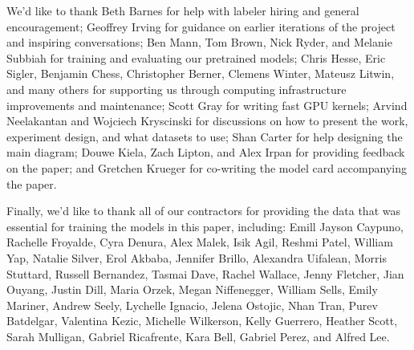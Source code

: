We'd like to thank Beth Barnes for help with labeler hiring and general encouragement; Geoffrey Irving for guidance on earlier iterations of the project and inspiring conversations; Ben Mann, Tom Brown, Nick Ryder, and Melanie Subbiah for training and evaluating our pretrained models; Chris Hesse, Eric Sigler, Benjamin Chess, Christopher Berner, Clemens Winter, Mateusz Litwin, and many others for supporting us through computing infrastructure improvements and maintenance; Scott Gray for writing fast GPU kernels; Arvind Neelakantan and Wojciech Kryscinski for discussions on how to present the work, experiment design, and what datasets to use; Shan Carter for help designing the main diagram; Douwe Kiela, Zach Lipton, and Alex Irpan for providing feedback on the paper; and Gretchen Krueger for co-writing the model card accompanying the paper. 

Finally, we'd like to thank all of our contractors for providing the data that was essential for training the models in this paper, including: Emill Jayson Caypuno, Rachelle Froyalde, Cyra Denura, Alex Malek, Isik Agil, Reshmi Patel, William Yap, Natalie Silver, Erol Akbaba, Jennifer Brillo, Alexandra Uifalean, Morris Stuttard, Russell Bernandez, Tasmai Dave, Rachel Wallace, Jenny Fletcher, Jian Ouyang, Justin Dill, Maria Orzek, Megan Niffenegger, William Sells, Emily Mariner, Andrew Seely, Lychelle Ignacio, Jelena Ostojic, Nhan Tran, Purev Batdelgar, Valentina Kezic, Michelle Wilkerson, Kelly Guerrero, Heather Scott, Sarah Mulligan, Gabriel Ricafrente, Kara Bell, Gabriel Perez, and Alfred Lee.  

